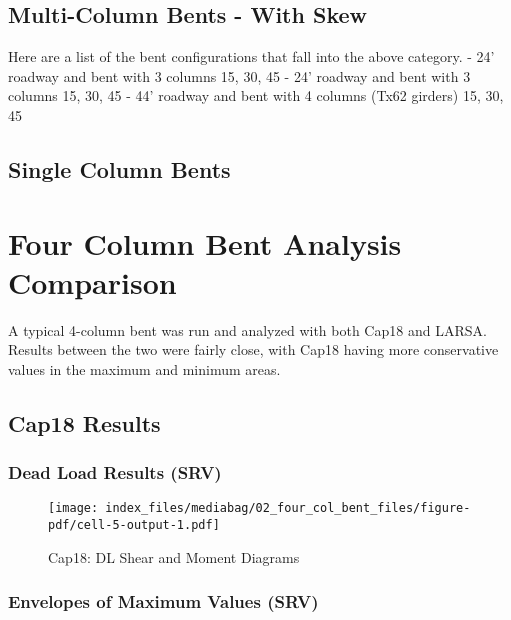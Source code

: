 \documentclass[
  letterpaper,
  DIV=11,
  numbers=noendperiod]{scrreprt}
\begin{document}
\section{Multi-Column Bents - With
Skew}\label{multi-column-bents---with-skew}

Here are a list of the bent configurations that fall into the above
category. - 24' roadway and bent with 3 columns 15, 30, 45 - 24' roadway
and bent with 3 columns 15, 30, 45 - 44' roadway and bent with 4 columns
(Tx62 girders) 15, 30, 45

\section{Single Column Bents}\label{single-column-bents}


\chapter{Four Column Bent Analysis
Comparison}\label{four-column-bent-analysis-comparison}

A typical 4-column bent was run and analyzed with both Cap18 and LARSA.
Results between the two were fairly close, with Cap18 having more
conservative values in the maximum and minimum areas.

\section{Cap18 Results}\label{cap18-results}

\subsection{Dead Load Results (SRV)}\label{dead-load-results-srv}

\begin{figure}[H]

{\centering \texttt{[image: index\_files/mediabag/02\_four\_col\_bent\_files/figure-pdf/cell-5-output-1.pdf]}

}

\caption{Cap18: DL Shear and Moment Diagrams}

\end{figure}%

\subsection{Envelopes of Maximum Values
(SRV)}\label{envelopes-of-maximum-values-srv}
\end{document}
